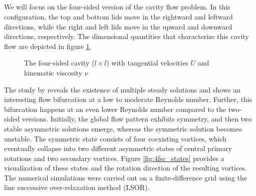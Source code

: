 \subsection{} \label{sec:4sc}

We will focus on the four-sided version of the cavity flow problem. In this
configuration, the top and bottom lids move in the rightward and leftward
directions, while the right and left lids move in the upward and downward
directions, respectively. The dimensional quantities that characterize this
cavity flow are depicted in figure \ref{fig:cav_4s}.

\begin{figure}[ht]
\centering
{}
\caption{The four-sided cavity ($l \times l$) with tangential velocities $U$
  and kinematic viscosity $\nu$ }
\label{fig:cav_4s}
\end{figure}

The study by \citet{wahba2009} reveals the existence of multiple steady
solutions and shows an interesting flow bifurcation at a low to moderate
Reynolds number. Further, this bifurcation happens at an even lower Reynolds
number compared to the two-sided versions. Initially, the global flow pattern
exhibits symmetry, and then two stable asymmetric solutions emerge, whereas the
symmetric solution becomes unstable. The symmetric state consists of four
coexisting vortices, which eventually collapse into two different asymmetric
states of central primary rotations and two secondary vortices. Figure
\ref{fig:4fsc_states} provides a visualization of these states and the rotation
direction of the resulting vortices. The numerical simulations were carried out
on a finite-difference grid using the line successive over-relaxation method
(LSOR). \\

